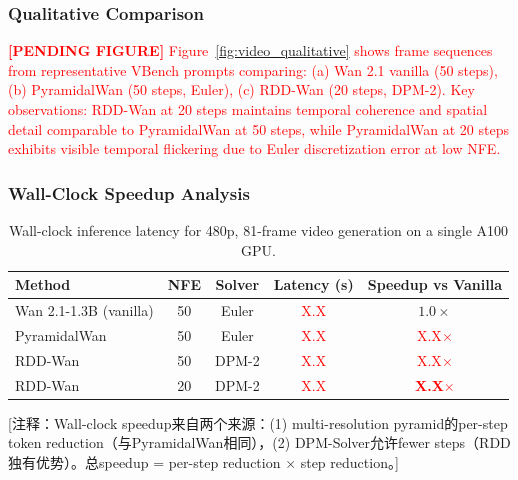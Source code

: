 \subsubsection{Qualitative Comparison}

\textcolor{red}{%
\textbf{[PENDING FIGURE]} Figure~\ref{fig:video_qualitative} shows frame sequences from representative VBench prompts comparing:
(a) Wan 2.1 vanilla (50 steps), (b) PyramidalWan (50 steps, Euler), (c) RDD-Wan (20 steps, DPM-2).
Key observations: RDD-Wan at 20 steps maintains temporal coherence and spatial detail comparable to PyramidalWan at 50 steps, while PyramidalWan at 20 steps exhibits visible temporal flickering due to Euler discretization error at low NFE.
}

\subsubsection{Wall-Clock Speedup Analysis}

\begin{table}[t]
\centering
\caption{Wall-clock inference latency for 480p, 81-frame video generation on a single A100 GPU.}
\label{tab:video_speed}
\small
\begin{tabular}{@{}lcccc@{}}
\toprule
\textbf{Method} & \textbf{NFE} & \textbf{Solver} & \textbf{Latency (s)} & \textbf{Speedup vs Vanilla} \\
\midrule
Wan 2.1-1.3B (vanilla) & 50 & Euler & \textcolor{red}{X.X} & $1.0\times$ \\
PyramidalWan & 50 & Euler & \textcolor{red}{X.X} & \textcolor{red}{X.X$\times$} \\
RDD-Wan & 50 & DPM-2 & \textcolor{red}{X.X} & \textcolor{red}{X.X$\times$} \\
RDD-Wan & 20 & DPM-2 & \textcolor{red}{X.X} & \textcolor{red}{\textbf{X.X}$\times$} \\
\bottomrule
\end{tabular}
\end{table}

\textcolor{green!50!black}{[注释：Wall-clock speedup来自两个来源：(1) multi-resolution pyramid的per-step token reduction（与PyramidalWan相同），(2) DPM-Solver允许fewer steps（RDD独有优势）。总speedup = per-step reduction × step reduction。]}



